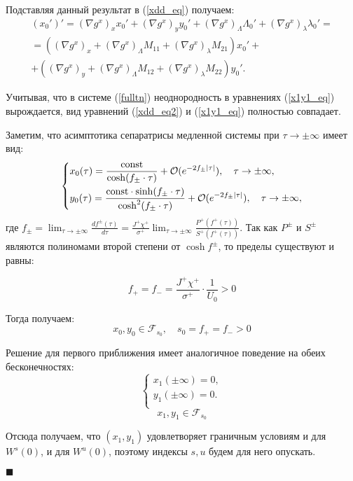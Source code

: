 \begin{enumerate}
Подставляя данный результат в (\ref{xdd_eq}) получаем:
\begin{multline}
(x_0')' = (\nabla g^x)_x x_0' + (\nabla g^x)_y y_0' + (\nabla g^x)_\Lambda \Lambda_0' + (\nabla g^x)_\lambda \lambda_0' = \\
= 
\left( (\nabla g^x)_x + (\nabla g^x)_\Lambda M_{11} + (\nabla g^x)_\lambda M_{21} \right) x_0' +\\
+\left( (\nabla g^x)_y + (\nabla g^x)_\Lambda M_{12} + (\nabla g^x)_\lambda M_{22} \right) y_0'.
\label{xdd_eq2}
\end{multline}

Учитывая, что в системе (\ref{fulltn}) неоднородность в уравнениях (\ref{x1y1_eq}) вырождается, вид уравнений (\ref{xdd_eq2}) и (\ref{x1y1_eq}) полностью совпадает.

Заметим, что асимптотика сепаратрисы медленной системы при $\tau \to \pm \infty$ имеет вид: 
\begin{equation*}
    \begin{dcases}
        x_0(\tau) = \frac{\text{const}}{\cosh(f_\pm \cdot \tau)} + \mathcal{O}(e^{-2 f_\pm |\tau|}), \quad \tau \to \pm \infty,\\
        y_0(\tau) = \frac{\text{const} \cdot \sinh(f_\pm \cdot \tau)}{\cosh^2(f_\pm \cdot \tau)} + \mathcal{O}(e^{-2 f_\pm |\tau|}), \quad \tau \to \pm \infty,
    \end{dcases}
\end{equation*}
где $f_\pm = \lim_{\tau \to \pm \infty} \frac{d f^\pm(\tau)}{d\tau} = \frac{J^{+} \chi^{+}}{\sigma^{+}}  \lim_{\tau \to \pm \infty} \frac{P^{+}(f^{+}(\tau))}{S^{+}(f^{+}(\tau))}$. Так как $P^\pm$ и $S^\pm$ являются полиномами второй степени от $\cosh f^\pm$, то пределы существуют и  равны:
 
$$f_+ = f_- = \frac{J^{+} \chi^{+}}{\sigma^{+}} \cdot \frac{1}{U_0} >0$$

Тогда получаем:
$$x_0,y_0 \in \mathcal{F}_{s_0}, \quad s_0 = f_+ = f_- > 0$$

Решение для первого приближения имеет аналогичное поведение на обеих бесконечностях:
\begin{equation*}
    \begin{cases}
        x_1(\pm \infty) = 0, \\
        
        y_1(\pm \infty) = 0. \\
    \end{cases}
\end{equation*}
$$x_1, y_1 \in \mathcal{F}_{s_0}$$

Отсюда получаем, что $(x_1,y_1)$ удовлетворяет граничным условиям и для $W^s(0)$, и для $W^u(0)$, поэтому индексы $s,u$ будем для него опускать. 

$\blacksquare$

\end{enumerate}

